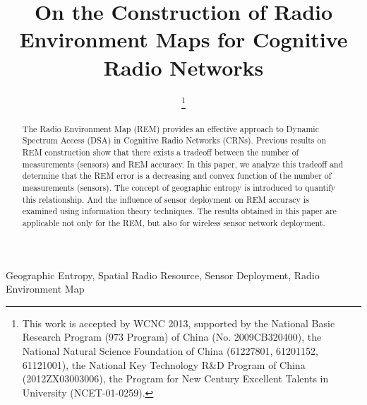 \documentclass[conference]{IEEEtran}
\begin{document}
\title{On the Construction of Radio Environment Maps for Cognitive Radio Networks}
\author{
 \and
{}
\thanks{This work is accepted by WCNC 2013, supported by the National Basic Research Program (973 Program) of China (No. 2009CB320400), the
National Natural Science Foundation of China (61227801, 61201152, 61121001), the National Key Technology R\&D
Program of China (2012ZX03003006), the Program for New Century Excellent Talents in
University (NCET-01-0259).}}
\maketitle

\begin{abstract}
The Radio Environment Map (REM) provides an effective approach to Dynamic Spectrum Access (DSA) in Cognitive Radio Networks (CRNs).
Previous results on REM construction show that there exists a tradeoff between the number of measurements (sensors) and REM accuracy.
In this paper, we analyze this tradeoff and determine that the REM error is a decreasing and convex function of the number of measurements (sensors).
The concept of geographic entropy is introduced to quantify this relationship.
And the influence of sensor deployment on REM accuracy is examined using information theory techniques.
The results obtained in this paper are applicable not only for the REM, but also for wireless sensor network deployment.\\
\end{abstract}

\begin{keywords}
Geographic Entropy, Spatial Radio Resource, Sensor Deployment, Radio Environment Map
\end{keywords}
\end{document}
